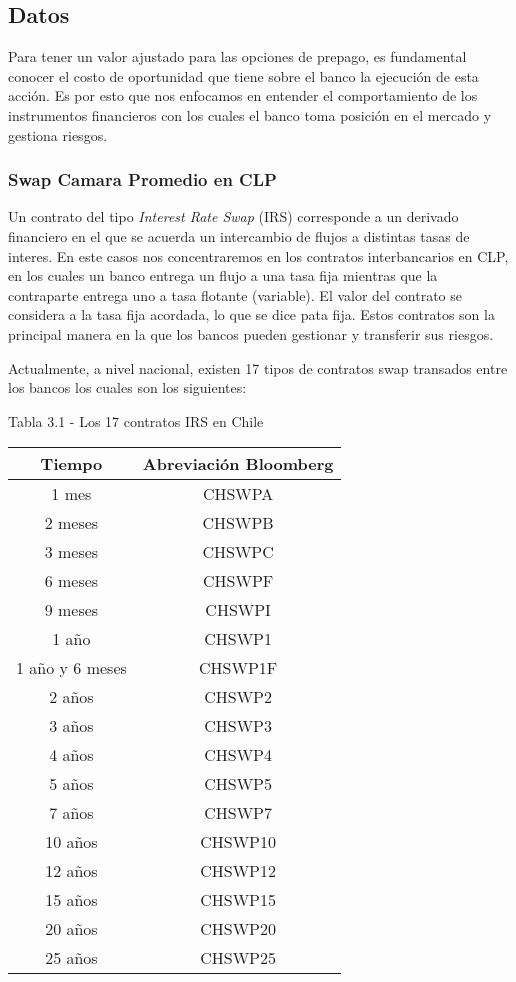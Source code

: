 \subsection{Datos}

\qquad Para tener un valor ajustado para las opciones de prepago, es fundamental conocer el costo de oportunidad que tiene sobre el banco la ejecución de esta acción. Es por esto que nos enfocamos en entender el comportamiento de los instrumentos financieros con los cuales el banco toma posición en el mercado y gestiona riesgos.

\subsubsection{Swap Camara Promedio en CLP}

\qquad Un contrato del tipo \textit{Interest Rate Swap} (IRS) corresponde a un derivado financiero en el que se acuerda un intercambio de flujos a distintas tasas de interes. En este casos nos concentraremos en los contratos interbancarios en CLP, en los cuales un banco entrega un flujo a una tasa fija mientras que la contraparte entrega uno a tasa flotante (variable). El valor del contrato se considera a la tasa fija acordada, lo que se dice pata fija. Estos contratos son la principal manera en la que los bancos pueden gestionar y transferir sus riesgos.

\qquad Actualmente, a nivel nacional, existen 17 tipos de contratos swap transados entre los bancos los cuales son los siguientes:

\begin{center}
    {\small Tabla 3.1 - Los 17 contratos IRS en Chile}\\
    \begin{tabular}{| c | c |}
    \hline
    Tiempo & Abreviación Bloomberg \\ \hline
    1 mes & CHSWPA \\ \hline
    2 meses & CHSWPB \\ \hline
    3 meses & CHSWPC \\ \hline
    6 meses & CHSWPF \\ \hline
    9 meses & CHSWPI \\ \hline
    1 año & CHSWP1 \\ \hline
    1 año y 6 meses & CHSWP1F \\ \hline
    2 años & CHSWP2 \\ \hline
    3 años & CHSWP3 \\ \hline
    4 años & CHSWP4 \\ \hline
    5 años & CHSWP5 \\ \hline
    7 años & CHSWP7 \\ \hline
    10 años & CHSWP10 \\ \hline
    12 años & CHSWP12 \\ \hline
    15 años & CHSWP15 \\ \hline
    20 años & CHSWP20 \\ \hline
    25 años & CHSWP25 \\ \hline
\end{tabular}
\end{center}

